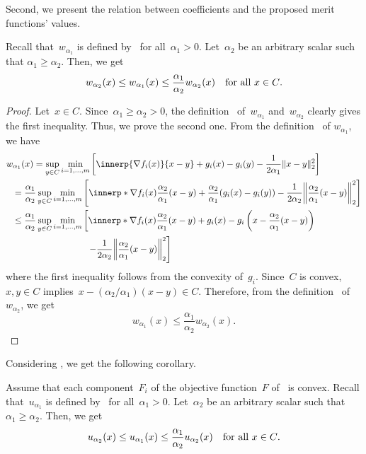 \documentclass[../main]{subfiles}
\begin{document}
Second, we present the relation between coefficients and the proposed merit functions' values.
\begin{theorem} 
    Recall that~$w_{\alpha_1}$ is defined by~ for all~$\alpha_1 > 0$.
    Let~$\alpha_2$ be an arbitrary scalar such that $\alpha_1 \ge \alpha_2$.
    Then, we get
    \begin{equation}
        w_{\alpha_2}(x) \le w_{\alpha_1}(x) \le \frac{\alpha_1}{\alpha_2} w_{\alpha_2}(x) \quad \text{for all~$x \in C$}
    .\end{equation}
\end{theorem}
\begin{proof}
    Let~$x \in C$.
    Since~$\alpha_1 \ge \alpha_2 > 0$, the definition~ of~$w_{\alpha_1}$ and~$w_{\alpha_2}$ clearly gives the first inequality.
    Thus, we prove the second one.
    From the definition~ of $w_{\alpha_1}$, we have
\begin{align}
    \MoveEqLeft w_{\alpha_1}(x) = \sup_{y \in C} \min_{i = 1, \dots, m} \left[ \innerp{\nabla f_i(x)}{x - y} + g_i(x) - g_i(y) - \frac{1}{2 \alpha_1}\norm{x - y}_2^2 \right] \\
    ={}& \frac{\alpha_1}{\alpha_2} \sup_{y \in C} \min_{i = 1, \dots, m} \left[ \innerp*{\nabla f_i(x)}{ \frac{\alpha_2}{\alpha_1}(x - y) } + \frac{\alpha_2}{\alpha_1}(g_i(x) - g_i(y)) - \frac{1}{2 \alpha_2} \norm*{ \frac{\alpha_2}{\alpha_1} (x - y) }_2^2 \right] \\
    \le{}& \frac{\alpha_1}{\alpha_2} \sup_{y \in C} \min_{i = 1, \dots, m} \left[ \innerp*{\nabla f_i(x)}{ \frac{\alpha_2}{\alpha_1} (x - y) } + g_i(x) - g_i \left(x - \frac{\alpha_2}{\alpha_1}(x - y)\right) \right. \\
        &\hspace{7em} \left. - \frac{1}{2 \alpha_2}\norm*{\frac{\alpha_2}{\alpha_1}(x - y)}_2^2 \right]
\end{align}
where the first inequality follows from the convexity of~$g_i$.
Since~$C$ is convex, $x, y \in C$ implies~$x - (\alpha_2 / \alpha_1)(x - y) \in C$.
Therefore, from the definition~ of~$w_{\alpha_2}$, we get
\begin{equation}
    w_{\alpha_1}(x) \le \frac{\alpha_1}{\alpha_2} w_{\alpha_2}(x)
.\end{equation} 
\end{proof}

Considering , we get the following corollary.
\begin{corollary}
    Assume that each component~$F_i$ of the objective function~$F$ of~ is convex.
    Recall that~$u_{\alpha_1}$ is defined by~ for all~$\alpha_1 > 0$.
    Let~$\alpha_2$ be an arbitrary scalar such that $\alpha_1 \ge \alpha_2$.
    Then, we get
    \begin{equation}
        u_{\alpha_2}(x) \le u_{\alpha_1}(x) \le \frac{\alpha_1}{\alpha_2} u_{\alpha_2}(x) \quad \text{for all~$x \in C$}
    .\end{equation}
\end{corollary}
\end{document}
